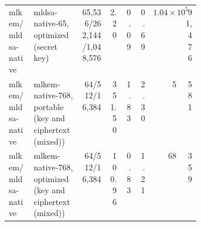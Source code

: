 \begin{table}[h]
\begin{tabular}{@{}>{\raggedright\arraybackslash}p{0.13\linewidth}>{\raggedright\arraybackslash}p{0.25\linewidth}rrrrrr@{}}
mlkem/mldsa-native & mldsa-native-65, optimized (secret key) & 65,536/262,144/1,048,576 & 2.20 & 0.09 & 0.69 & $1.04\times10^{5}$ & 91,476 \\
mlkem/mldsa-native & mlkem-native-768, portable (key and ciphertext (mixed)) & 64/512/16,384 & 351.50 & 1.83 & 2.30 & 5 & 581 \\
mlkem/mldsa-native & mlkem-native-768, optimized (key and ciphertext (mixed)) & 64/512/16,384 & 100.96 & 0.83 & 1.21 & 68 & 359 \\
\bottomrule
\end{tabular}
\end{table}
